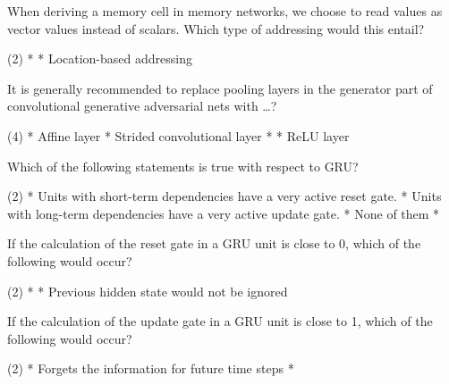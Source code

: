 \documentclass[10pt]{extarticle}
\begin{document}
\begin{exercise}
    When deriving a memory cell in memory networks, we choose to read values as vector values instead of scalars. Which type of addressing would this entail?
    \begin{choice} (2)
        *
        * Location-based addressing
    \end{choice}
\end{exercise}
\begin{solution}
\end{solution}

\begin{exercise}
    It is generally recommended to replace pooling layers in the generator part of convolutional generative adversarial nets with \dots?
    \begin{choice} (4)
        * Affine layer
        * Strided convolutional layer
        *
        * ReLU layer
    \end{choice}
\end{exercise}
\begin{solution}
\end{solution}

\begin{exercise}
    Which of the following statements is true with respect to GRU?
    \begin{choice} (2)
        * Units with short-term dependencies have a very active reset gate.
        * Units with long-term dependencies have a very active update gate.
        * None of them
        * 
    \end{choice}
\end{exercise}
\begin{solution}
\end{solution}

\begin{exercise}
    If the calculation of the reset gate in a GRU unit is close to 0, which of the following would occur?
    \begin{choice} (2)
        *
        * Previous hidden state would not be ignored
    \end{choice}
\end{exercise}
\begin{solution}
\end{solution}

\begin{exercise}
    If the calculation of the update gate in a GRU unit is close to 1, which of the following would occur?
    \begin{choice} (2)
        * Forgets the information for future time steps
        *
    \end{choice}
\end{exercise}
\begin{solution}
\end{solution}
\end{document}
